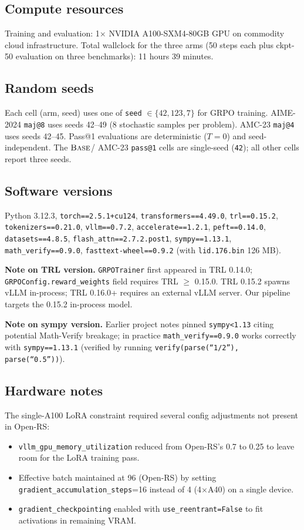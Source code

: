 \subsection{Compute resources}
Training and evaluation: 1$\times$ NVIDIA A100-SXM4-80GB GPU on commodity
cloud infrastructure. Total wallclock for the three arms (50 steps each
plus ckpt-50 evaluation on three benchmarks): 11 hours 39 minutes.

\subsection{Random seeds}
Each cell (arm, seed) uses one of \texttt{seed} $\in \{42, 123, 7\}$ for
GRPO training. AIME-2024 \texttt{maj@8} uses seeds 42--49 (8 stochastic
samples per problem). AMC-23 \texttt{maj@4} uses seeds 42--45. Pass@1
evaluations are deterministic ($T{=}0$) and seed-independent. The
$\textsc{Base}$/\armD{} AMC-23 \texttt{pass@1} cells are single-seed
(\texttt{42}); all other cells report three seeds.

\subsection{Software versions}
Python 3.12.3, \texttt{torch==2.5.1+cu124}, \texttt{transformers==4.49.0},
\texttt{trl==0.15.2}, \texttt{tokenizers==0.21.0}, \texttt{vllm==0.7.2},
\texttt{accelerate==1.2.1}, \texttt{peft==0.14.0}, \texttt{datasets==4.8.5},
\texttt{flash\_attn==2.7.2.post1}, \texttt{sympy==1.13.1},
\texttt{math\_verify==0.9.0}, \texttt{fasttext-wheel==0.9.2}
(with \texttt{lid.176.bin} 126 MB).

\textbf{Note on TRL version.} \texttt{GRPOTrainer} first appeared in TRL 0.14.0;
\texttt{GRPOConfig.reward\_weights} field requires TRL $\geq$ 0.15.0. TRL 0.15.2
spawns vLLM in-process; TRL 0.16.0+ requires an external vLLM server. Our pipeline
targets the 0.15.2 in-process model.

\textbf{Note on sympy version.} Earlier project notes pinned
\texttt{sympy<1.13} citing potential Math-Verify breakage; in practice
\texttt{math\_verify==0.9.0} works correctly with \texttt{sympy==1.13.1}
(verified by running \texttt{verify(parse(``1/2''), parse(``0.5''))}).

\subsection{Hardware notes}
The single-A100 LoRA constraint required several config adjustments not present
in Open-RS:
\begin{itemize}\itemsep0pt
\item \texttt{vllm\_gpu\_memory\_utilization} reduced from Open-RS's 0.7 to 0.25 to
leave room for the LoRA training pass.
\item Effective batch maintained at 96 (Open-RS) by setting
\texttt{gradient\_accumulation\_steps}=16 instead of 4 (4$\times$A40) on a single
device.
\item \texttt{gradient\_checkpointing} enabled with
\texttt{use\_reentrant=False} to fit activations in remaining VRAM.
\end{itemize}

